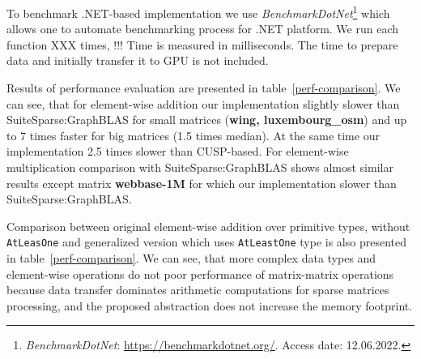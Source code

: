To benchmark .NET-based implementation we use \textit{BenchmarkDotNet}\footnote{\textit{BenchmarkDotNet}: \url{https://benchmarkdotnet.org/}. Access date: 12.06.2022.} which allows one to automate benchmarking process for .NET platform.
We run each function XXX times, !!!
Time is measured in milliseconds. The time to prepare data and initially transfer it to GPU is not included.

Results of performance evaluation are presented in table~\ref{perf-comparison}.
We can see, that for element-wise addition our implementation slightly slower than SuiteSparse:GraphBLAS for small matrices (\textbf{wing, luxembourg\_osm}) and up to 7 times faster for big matrices (1.5 times median). At the same time our implementation 2.5 times slower than CUSP-based. For element-wise multiplication comparison with SuiteSparse:GraphBLAS shows almost similar results except matrix \textbf{webbase-1M} for which our implementation slower than SuiteSparse:GraphBLAS.

Comparison between original element-wise addition over primitive types, without \texttt{AtLeasOne} and generalized version which uses \texttt{AtLeastOne} type is also presented in table~\ref{perf-comparison}.
We can see, that more complex data types and element-wise operations do not poor performance of matrix-matrix operations because data transfer dominates arithmetic computations for sparse matrices processing, and the proposed abstraction does not increase the memory footprint.
